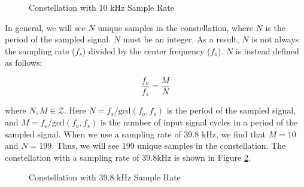 \documentclass{article}
\begin{document}
\begin{figure}[H]
	\centerline{}
	\caption{Constellation with 10 kHz Sample Rate}
	\label{fig::iq_imbalance_0_mag_0_phase_10k_samp_rate_const}
\end{figure}

In general, we will see $N$ unique samples in the constellation, where $N$ is the period of the sampled signal. $N$ must be an integer. As a result, $N$ is not always the sampling rate ($f_s$) divided by the center frequency ($f_o$). $N$ is instead defined as follows:

\begin{equation}
	\frac{f_o}{f_s} = \frac{M}{N} \label{eq::period_of_discrete_signal}
\end{equation}

where $N, M \in \mathcal{Z}$. Here $N=f_s/\text{gcd}(f_o,f_s)$ is the period of the sampled signal, and $M=f_o/\text{gcd}(f_o,f_s)$ is the number of input signal cycles in a period of the sampled signal. When we use a sampling rate of 39.8 kHz, we find that $M=10$ and $N=199$. Thus, we will see 199 unique samples in the constellation. The constellation with a sampling rate of 39.8kHz is shown in Figure \ref{fig::iq_imbalance_0_mag_0_phase_39p8k_samp_rate_const}.

\begin{figure}[H]
	\centerline{}
	\caption{Constellation with 39.8 kHz Sample Rate}
	\label{fig::iq_imbalance_0_mag_0_phase_39p8k_samp_rate_const}
\end{figure}
\end{document}
